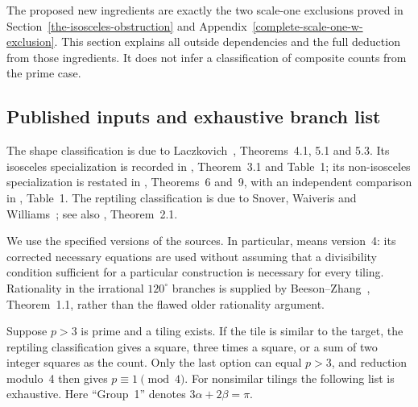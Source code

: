 \documentclass[
  11pt,
  a4paper,
]{article}
\begin{document}
The proposed new ingredients are exactly the two scale-one exclusions
proved in Section~\ref{the-isosceles-obstruction} and
Appendix~\ref{complete-scale-one-w-exclusion}. This section explains all
outside dependencies and the full deduction from those ingredients. It
does not infer a classification of composite counts from the prime case.

\subsection{Published inputs and exhaustive branch list}

The shape classification is due to Laczkovich~\cite{laczkovich},
Theorems~4.1, 5.1 and 5.3. Its isosceles specialization is recorded in
\cite{isosceles}, Theorem~3.1 and Table~1; its non-isosceles
specialization is restated in \cite{prime}, Theorems~6 and~9, with an
independent comparison in \cite{rationality}, Table~1. The reptiling
classification is due to Snover, Waiveris and Williams~\cite{reptile};
see also \cite{isosceles}, Theorem~2.1.

We use the specified versions of the sources. In particular,
\cite{group1} means version~4: its corrected necessary equations are
used without assuming that a divisibility condition sufficient for a
particular construction is necessary for every tiling. Rationality in
the irrational $120^\circ$ branches is supplied by
Beeson--Zhang~\cite{rationality}, Theorem~1.1, rather than the flawed
older rationality argument.

Suppose $p>3$ is prime and a tiling exists. If the tile is similar to
the target, the reptiling classification gives a square, three times a
square, or a sum of two integer squares as the count. Only the last
option can equal $p>3$, and reduction modulo~4 then gives
$p\equiv1\pmod4$. For nonsimilar tilings the following list is
exhaustive. Here ``Group~1'' denotes $3\alpha+2\beta=\pi$.
\end{document}
